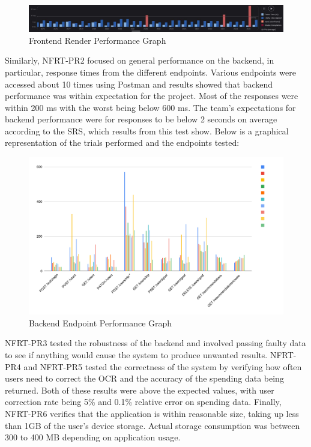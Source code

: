 \documentclass[12pt, titlepage]{article}
\begin{document}
\begin{figure}[H]
  \centering
  \includegraphics[width=\textwidth]{frontend_performance_graph.pdf}
  \caption{Frontend Render Performance Graph}
  \label{fig:FrontendPerformanceGraph}
\end{figure}

Similarly, NFRT-PR2 focused on general performance on the backend, in particular, response times from the
different endpoints. Various endpoints were accessed about 10 times using Postman and results showed that
backend performance was within expectation for the project. Most of the responses were within 200 ms with the
worst being below 600 ms. The team's expectations for backend performance were for responses to be below 2 seconds
on average according to the SRS, which results from this test show. Below is a graphical representation of the
trials performed and the endpoints tested:

\begin{figure}[H]
  \centering
  \includegraphics[width=\textwidth]{backend_performance_graph.pdf}
  \caption{Backend Endpoint Performance Graph}
  \label{fig:BacendPerformanceGraph}
\end{figure}

NFRT-PR3 tested the robustness of the backend and involved passing faulty data to see if anything would cause the
system to produce unwanted results. NFRT-PR4 and NFRT-PR5 tested the correctness of the system by verifying how
often users need to correct the OCR and the accuracy of the spending data being returned. Both of these results
were above the expected values, with user correction rate being 5\% and 0.1\% relative error on spending data. Finally,
NFRT-PR6 verifies that the application is within reasonable size, taking up less than 1GB of the user's device
storage. Actual storage consumption was between 300 to 400 MB depending on application usage.
\end{document}
